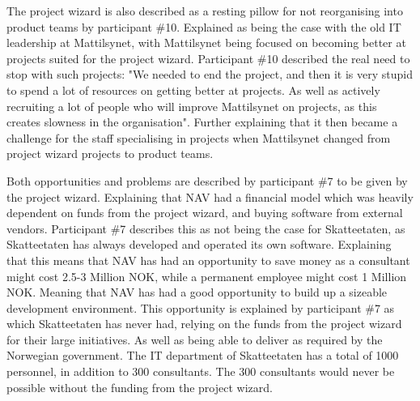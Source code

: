 The project wizard is also described as a resting pillow for not reorganising into product teams by participant \#10. Explained as being the case with the old IT leadership at Mattilsynet, with Mattilsynet being focused on becoming better at projects suited for the project wizard. Participant \#10 described the real need to stop with such projects: "We needed to end the project, and then it is very stupid to spend a lot of resources on getting better at projects. As well as actively recruiting a lot of people who will improve Mattilsynet on projects, as this creates slowness in the organisation". Further explaining that it then became a challenge for the staff specialising in projects when Mattilsynet changed from project wizard projects to product teams.


Both opportunities and problems are described by participant \#7 to be given by the project wizard. Explaining that NAV had a financial model which was heavily dependent on funds from the project wizard, and buying software from external vendors. Participant \#7 describes this as not being the case for Skatteetaten, as Skatteetaten has always developed and operated its own software. Explaining that this means that NAV has had an opportunity to save money as a consultant might cost 2.5-3 Million NOK, while a permanent employee might cost 1 Million NOK. Meaning that NAV has had a good opportunity to build up a sizeable development environment. This opportunity is explained by participant \#7 as which Skatteetaten has never had, relying on the funds from the project wizard for their large initiatives. As well as being able to deliver as required by the Norwegian government. The IT department of Skatteetaten has a total of 1000 personnel, in addition to 300 consultants. The 300 consultants would never be possible without the funding from the project wizard.

